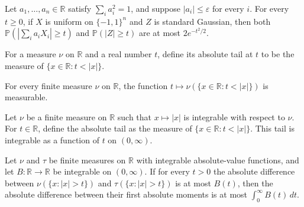 \begin{theorem}
\label{FABL.exercise5_31a}
\leanok
{}
Let $a_1,\ldots,a_n\in\mathbb{R}$ satisfy $\sum_i a_i^2=1$, and suppose
$|a_i|\leq\varepsilon$ for every $i$. For every $t\geq0$, if $X$ is uniform on
$\{-1,1\}^n$ and $Z$ is standard Gaussian, then both $\mathbb{P}(|\sum_i a_iX_i|\geq t)$
and $\mathbb{P}(|Z|\geq t)$ are at most $2e^{-t^2/2}$.
\end{theorem}

\begin{definition}
\label{FABL.absoluteTail}
\leanok
For a measure $\nu$ on $\mathbb R$ and a real number $t$, define its absolute tail at
$t$ to be the measure of $\{x\in\mathbb R:t<|x|\}$.
\end{definition}

\begin{theorem}
\label{FABL.measurable_absoluteTail}
\leanok
{}
For every finite measure $\nu$ on $\mathbb{R}$, the function $t\mapsto
\nu(\{x\in\mathbb{R}:t<|x|\})$ is measurable.
\end{theorem}

\begin{theorem}
\label{FABL.integrableOn_absoluteTail}
\leanok
{}
Let $\nu$ be a finite measure on $\mathbb{R}$ such that $x\mapsto |x|$ is integrable
with respect to $\nu$. For $t\in\mathbb{R}$, define the absolute tail as the measure of
$\{x\in\mathbb{R}:t<|x|\}$. This tail is integrable as a function of $t$ on
$(0,\infty)$.
\end{theorem}

\begin{theorem}
\label{FABL.abs_integral_abs_sub_le_of_absoluteTail}
\leanok
{}
Let $\nu$ and $\tau$ be finite measures on $\mathbb R$ with integrable absolute-value
functions, and let $B:\mathbb R\to\mathbb R$ be integrable on $(0,\infty)$. If for
every $t>0$ the absolute difference between $\nu(\{x:|x|>t\})$ and
$\tau(\{x:|x|>t\})$ is at most $B(t)$, then the absolute difference between their
first absolute moments is at most $\int_0^\infty B(t)\,dt$.
\end{theorem}


